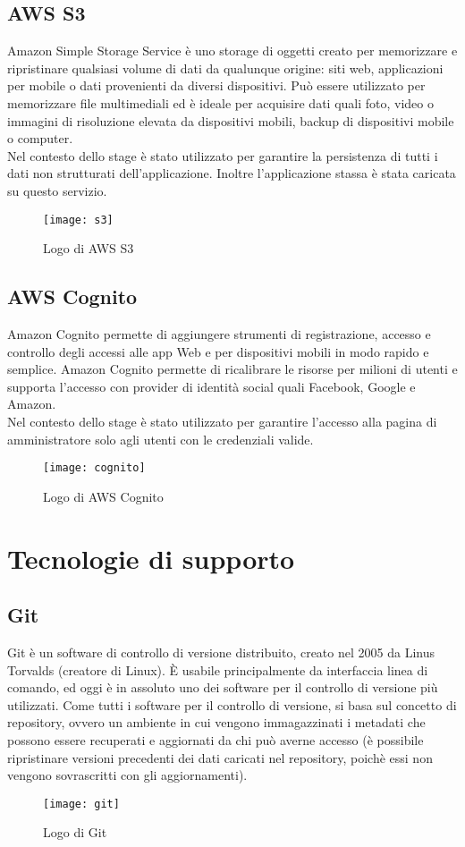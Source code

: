 \subsection{AWS S3} 
Amazon Simple Storage Service è uno storage di
oggetti creato per memorizzare e ripristinare qualsiasi volume di dati da qualunque
origine: siti web, applicazioni per mobile o dati provenienti da diversi dispositivi. Può
essere utilizzato per memorizzare file multimediali ed è ideale per acquisire dati quali
foto, video o immagini di risoluzione elevata da dispositivi mobili, backup di dispositivi
mobile o computer.
\\

Nel contesto dello stage è stato utilizzato per garantire la persistenza di tutti i dati
non strutturati dell’applicazione. Inoltre l'applicazione stassa è stata caricata su questo servizio.   
\begin{figure}[!h] 
	\centering 
	\texttt{[image: s3]}
	\caption{Logo di AWS S3}
\end{figure}

\subsection{AWS Cognito} 
Amazon Cognito permette di aggiungere strumenti di registrazione, accesso e controllo degli accessi alle app Web e per dispositivi mobili in modo rapido e semplice. Amazon Cognito permette di ricalibrare le risorse per milioni di utenti e supporta l'accesso con provider di identità social quali Facebook, Google e Amazon. 
\\

Nel contesto dello stage è stato utilizzato per garantire l'accesso alla pagina di amministratore solo agli utenti con le credenziali valide.   
\begin{figure}[!h] 
	\centering 
	\texttt{[image: cognito]}
	\caption{Logo di AWS Cognito}
\end{figure}\newpage
\section{Tecnologie di supporto}
\subsection{Git}
Git è un software di controllo di versione distribuito, creato nel 2005 da Linus
Torvalds (creatore di Linux). È usabile principalmente da interfaccia linea di comando,
ed oggi è in assoluto uno dei software per il controllo di versione più utilizzati. Come
tutti i software per il controllo di versione, si basa sul concetto di repository, ovvero
un ambiente in cui vengono immagazzinati i metadati che possono essere recuperati e
aggiornati da chi può averne accesso (è possibile ripristinare versioni precedenti dei
dati caricati nel repository, poichè essi non vengono sovrascritti con gli aggiornamenti).
\begin{figure}[!h] 
	\centering 
	\texttt{[image: git]}
	\caption{Logo di Git}
\end{figure}

